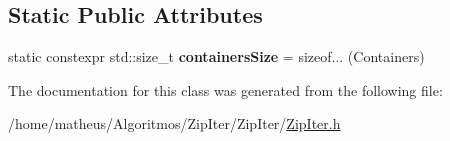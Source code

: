 \subsection*{Static Public Attributes}
\begin{DoxyCompactItemize}
\item 
static constexpr std\+::size\+\_\+t {\bfseries containers\+Size} = sizeof... (Containers)\hypertarget{classit_1_1Zip_acab4facb889a92e7f2d2c3c4b1f7d2ab}{}\label{classit_1_1Zip_acab4facb889a92e7f2d2c3c4b1f7d2ab}

\end{DoxyCompactItemize}


The documentation for this class was generated from the following file\+:\begin{DoxyCompactItemize}
\item 
/home/matheus/\+Algoritmos/\+Zip\+Iter/\+Zip\+Iter/\hyperlink{ZipIter_8h}{Zip\+Iter.\+h}\end{DoxyCompactItemize}
